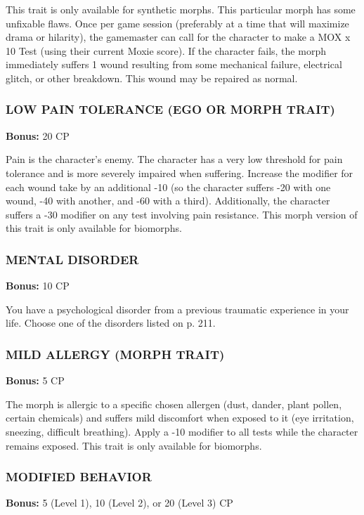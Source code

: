 This trait is only available for synthetic morphs.  This particular morph has
some unfixable flaws. Once per game session (preferably at a time that will
maximize drama or hilarity), the gamemaster can call for the character to
make a MOX x 10 Test (using their current Moxie score). If the character fails,
the morph immediately suffers 1 wound resulting from some mechanical failure,
electrical glitch, or other breakdown.  This wound may be repaired as normal.

\subsubsection{LOW PAIN TOLERANCE (EGO OR MORPH TRAIT)}
\textbf{Bonus:} 20 CP

Pain is the character’s enemy. The character has a very low threshold for pain
tolerance and is more severely impaired when suffering. Increase the modifier
for each wound take by an additional -10 (so the character suffers -20 with one
wound, -40 with another, and -60 with a third). Additionally, the character
suffers a -30 modifier on any test involving pain resistance. This morph
version of this trait is only available for biomorphs.

\subsubsection{MENTAL DISORDER}
\textbf{Bonus:} 10 CP

You have a psychological disorder from a previous traumatic experience in your
life. Choose one of the disorders listed on p. 211.

\subsubsection{MILD ALLERGY (MORPH TRAIT)}
\textbf{Bonus:} 5 CP

The morph is allergic to a specific chosen allergen (dust, dander, plant
pollen, certain chemicals) and suffers mild discomfort when exposed to it
(eye irritation, sneezing, difficult breathing). Apply a -10 modifier to all
tests while the character remains exposed. This trait is only available for
biomorphs.

\subsubsection{MODIFIED BEHAVIOR}
\textbf{Bonus:} 5 (Level 1), 10 (Level 2), or 20 (Level 3) CP

